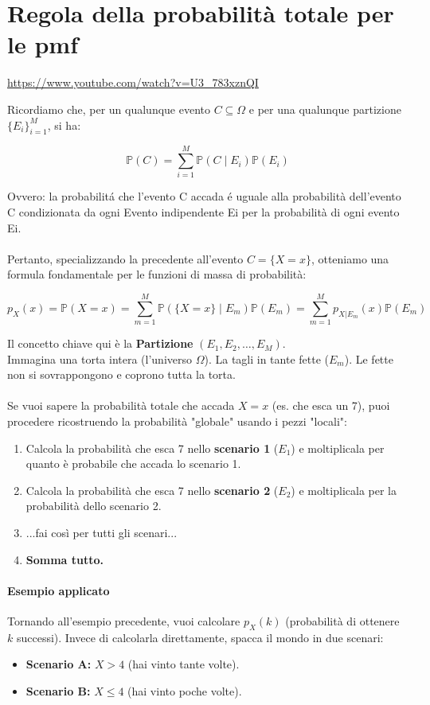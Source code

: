 \section{Regola della probabilità totale per le pmf}

\url{https://www.youtube.com/watch?v=U3_783xznQI}

Ricordiamo che, per un qualunque evento $C \subseteq \Omega$ e per una qualunque partizione $\{E_i\}_{i=1}^M$, si ha:

\[
\mathbb{P}(C) = \sum_{i=1}^M \mathbb{P}(C \mid E_i)\mathbb{P}(E_i)
\]

Ovvero: la probabilitá che l'evento C accada é uguale alla probabilità dell'evento C condizionata da ogni Evento indipendente Ei per la probabilità di ogni evento Ei.
\\\\
Pertanto, specializzando la precedente all'evento $C = \{X = x\}$, otteniamo una formula fondamentale per le funzioni di massa di probabilità:

\begin{equation}
\boxed{p_X(x) = \mathbb{P}(X = x) = \sum_{m=1}^M \mathbb{P}(\{X = x\} \mid E_m) \mathbb{P}(E_m) = \sum_{m=1}^M p_{X|E_m}(x)\mathbb{P}(E_m)}
\end{equation}

Il concetto chiave qui è la \textbf{Partizione} $(E_1, E_2, \dots, E_M)$.
\\Immagina una torta intera (l'universo $\Omega$). La tagli in tante fette ($E_m$). Le fette non si sovrappongono e coprono tutta la torta.
\\\\
Se vuoi sapere la probabilità totale che accada $X = x$ (es. che esca un 7), puoi procedere ricostruendo la probabilità "globale" usando i pezzi "locali":

\begin{enumerate}
    \item Calcola la probabilità che esca 7 nello \textbf{scenario 1} ($E_1$) e moltiplicala per quanto è probabile che accada lo scenario 1.
    \item Calcola la probabilità che esca 7 nello \textbf{scenario 2} ($E_2$) e moltiplicala per la probabilità dello scenario 2.
    \item ...fai così per tutti gli scenari...
    \item \textbf{Somma tutto.}
\end{enumerate}

\paragraph{Esempio applicato}
Tornando all'esempio precedente, vuoi calcolare $p_X(k)$ (probabilità di ottenere $k$ successi). Invece di calcolarla direttamente, spacca il mondo in due scenari:
\begin{itemize}
    \item \textbf{Scenario A:} $X > 4$ (hai vinto tante volte).
    \item \textbf{Scenario B:} $X \le 4$ (hai vinto poche volte).
\end{itemize}

